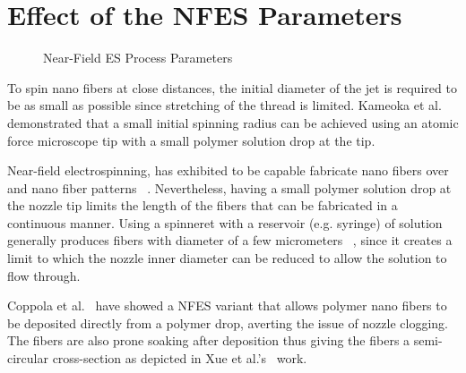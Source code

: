 \documentclass[5p,,preprint,12pt,twocolumn]{elsarticle}
\makeatletter
\def\fixFloatSize#1{}%
\makeatother
\begin{document}
\section{Effect of the NFES Parameters}

\bgroup
\fixFloatSize{images/43f61edd-73cd-4222-830e-3333f92934e9-uimg_nfesvariants.png}
\begin{figure}[!htbp]
\centering \makeatletter{}
\makeatother 
\caption{{Near-Field ES Process Parameters}}
\label{f-3629d3a3f9cf}
\end{figure}
\egroup
To spin nano fibers at close distances, the initial diameter of the jet is required to be as small as possible since stretching of the thread is limited. Kameoka et al.\unskip~\cite{527120:12321556} demonstrated that a small initial spinning radius can be achieved using an atomic force microscope tip with a small polymer solution drop at the tip.

Near-field electrospinning, has exhibited to be capable fabricate nano fibers over and nano fiber patterns \unskip~\cite{527120:11974321}. Nevertheless, having a small polymer solution drop at the nozzle tip limits the length of the fibers that can be fabricated in a continuous manner. Using a spinneret with a reservoir (e.g. syringe) of solution generally produces fibers with diameter of a few micrometers \unskip~\cite{527120:11974310,527120:11974326}, since it creates a limit to which the nozzle inner diameter can be reduced to allow the solution to flow through.

Coppola et al.\unskip~\cite{527120:11974307} have showed a NFES variant that allows polymer nano fibers to be deposited directly from a polymer drop, averting the issue of nozzle clogging. The fibers are also prone soaking after deposition thus giving the fibers a semi-circular cross-section as depicted in Xue et al.'s\unskip~\cite{527120:11974326} work. 
\end{document}
